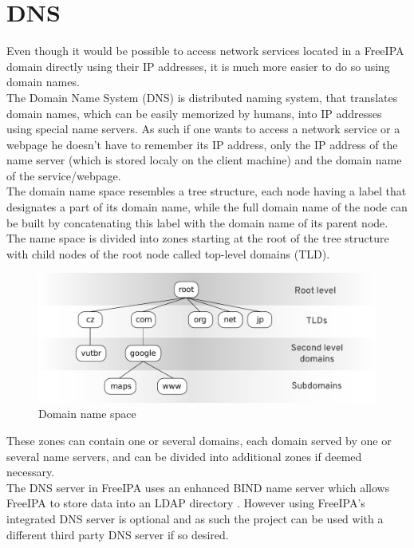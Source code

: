 \section{DNS}
Even though it would be possible to access network services located in a FreeIPA domain directly using their IP addresses, it is much more easier to do so using domain names. \\
The Domain Name System (DNS) \cite{dnsRFC} is distributed naming system, that translates domain names, which can be easily memorized by humans, into IP addresses using special name servers.
As such if one wants to access a network service or a webpage he doesn't have to remember its IP address, only the IP address of the name server (which is stored localy on the client machine) and the domain name of the service/webpage. \\
The domain name space resembles a tree structure, each node having a label that designates a part of its domain name, while the full domain name of the node can be built by concatenating this label with the domain name of its parent node. \\
The name space is divided into zones starting at the root of the tree structure with child nodes of the root node called top-level domains (TLD).

\begin{figure}[!ht]
    \centering
        \includegraphics[scale=0.6]{fig/dns-tree}
    \caption{Domain name space}
    \label{fig:dnsTree}
\end{figure}

These zones can contain one or several domains, each domain served by one or several name servers, and can be divided into additional zones if deemed necessary. \\
The DNS server in FreeIPA uses an enhanced BIND name server which allows FreeIPA to store data into an LDAP directory \cite{dnsIpa}.
However using FreeIPA's integrated DNS server is optional and as such the project can be used with a different third party DNS server if so desired.

